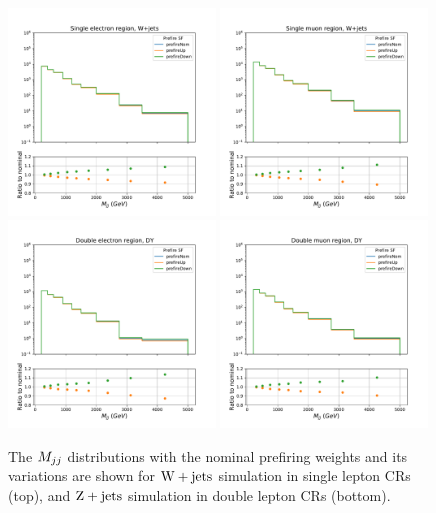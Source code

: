 \begin{figure}[htbp]
  \centering
    \includegraphics[width=0.49\textwidth]{ScaleFactors/Prefire/cr_1e_vbf.pdf}
    \includegraphics[width=0.49\textwidth]{ScaleFactors/Prefire/cr_1m_vbf.pdf} \\
    \includegraphics[width=0.49\textwidth]{ScaleFactors/Prefire/cr_2e_vbf.pdf}
    \includegraphics[width=0.49\textwidth]{ScaleFactors/Prefire/cr_2m_vbf.pdf}
    \caption{The $M_{jj}$ distributions with the nominal prefiring weights and its variations
    are shown for $\mathrm{W}+\textrm{jets}$ simulation in single lepton CRs (top), and $\mathrm{Z}+\textrm{jets}$ simulation in
    double lepton CRs (bottom).}
    \label{fig:prefiring_1}
\end{figure}

